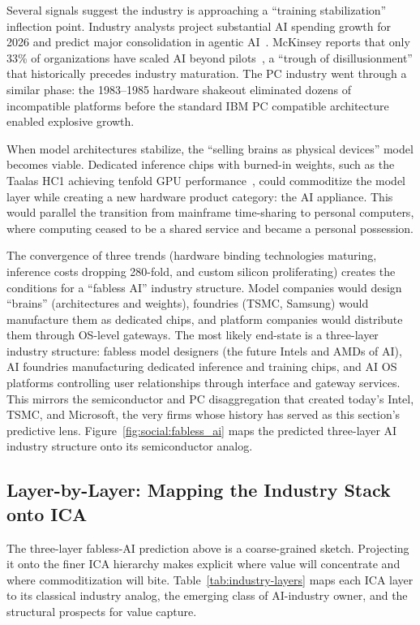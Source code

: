 Several signals suggest the industry is approaching a ``training stabilization'' inflection point. Industry analysts project substantial AI spending growth for 2026 and predict major consolidation in agentic AI~\cite{gartner2026trends}. McKinsey reports that only 33\% of organizations have scaled AI beyond pilots~\cite{mckinsey2025aisurvey}, a ``trough of disillusionment'' that historically precedes industry maturation. The PC industry went through a similar phase: the 1983--1985 hardware shakeout eliminated dozens of incompatible platforms before the standard IBM PC compatible architecture enabled explosive growth.

When model architectures stabilize, the ``selling brains as physical devices'' model becomes viable. Dedicated inference chips with burned-in weights, such as the Taalas HC1 achieving tenfold GPU performance~\cite{taalas_2026_hc1}, could commoditize the model layer while creating a new hardware product category: the AI appliance. This would parallel the transition from mainframe time-sharing to personal computers, where computing ceased to be a shared service and became a personal possession.

The convergence of three trends (hardware binding technologies maturing, inference costs dropping 280-fold, and custom silicon proliferating) creates the conditions for a ``fabless AI'' industry structure. Model companies would design ``brains'' (architectures and weights), foundries (TSMC, Samsung) would manufacture them as dedicated chips, and platform companies would distribute them through OS-level gateways. The most likely end-state is a three-layer industry structure: fabless model designers (the future Intels and AMDs of AI), AI foundries manufacturing dedicated inference and training chips, and AI OS platforms controlling user relationships through interface and gateway services. This mirrors the semiconductor and PC disaggregation that created today's Intel, TSMC, and Microsoft, the very firms whose history has served as this section's predictive lens.
Figure~\ref{fig:social:fabless_ai} maps the predicted three-layer AI industry structure onto its semiconductor analog.


\subsection{Layer-by-Layer: Mapping the Industry Stack onto ICA}
\label{sec:social-layers}

The three-layer fabless-AI prediction above is a coarse-grained sketch. Projecting it onto the finer ICA hierarchy makes explicit where value will concentrate and where commoditization will bite. Table~\ref{tab:industry-layers} maps each ICA layer to its classical industry analog, the emerging class of AI-industry owner, and the structural prospects for value capture.

